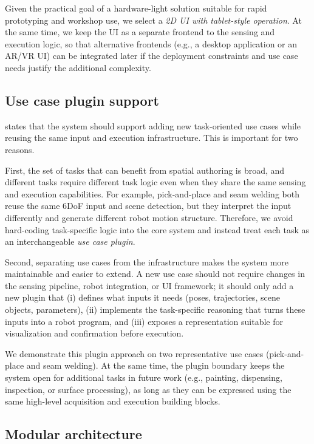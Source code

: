 Given the practical goal of a hardware-light solution suitable for rapid prototyping and workshop use, we select a \emph{2D UI with tablet-style operation}. At the same time, we keep the UI as a separate frontend to the sensing and execution logic, so that alternative frontends (e.g., a desktop application or an AR/VR UI) can be integrated later if the deployment constraints and use case needs justify the additional complexity.



\subsection{Use case plugin support} \label{subsec:ch2_analysis_use_case_plugins}

 states that the system should support adding new task-oriented use cases while reusing the same input and execution infrastructure. This is important for two reasons.

First, the set of tasks that can benefit from spatial authoring is broad, and different tasks require different task logic even when they share the same sensing and execution capabilities. For example, pick-and-place and seam welding both reuse the same 6DoF input and scene detection, but they interpret the input differently and generate different robot motion structure. Therefore, we avoid hard-coding task-specific logic into the core system and instead treat each task as an interchangeable \emph{use case plugin}.

Second, separating use cases from the infrastructure makes the system more maintainable and easier to extend. A new use case should not require changes in the sensing pipeline, robot integration, or UI framework; it should only add a new plugin that (i) defines what inputs it needs (poses, trajectories, scene objects, parameters), (ii) implements the task-specific reasoning that turns these inputs into a robot program, and (iii) exposes a representation suitable for visualization and confirmation before execution.

We demonstrate this plugin approach on two representative use cases (pick-and-place and seam welding). At the same time, the plugin boundary keeps the system open for additional tasks in future work (e.g., painting, dispensing, inspection, or surface processing), as long as they can be expressed using the same high-level acquisition and execution building blocks.


\subsection{Modular architecture} \label{subsec:ch2_analysis_modular_architecture}

